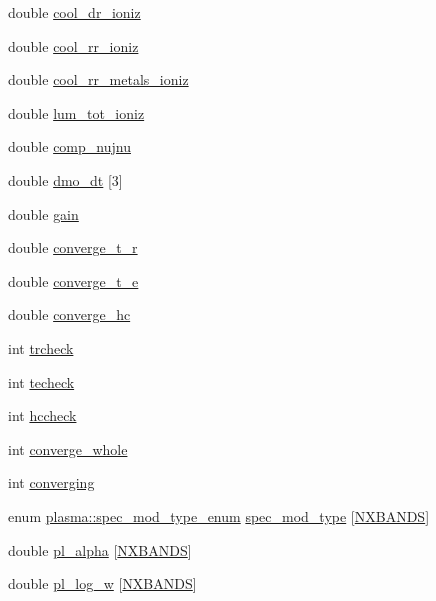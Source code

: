 \begin{DoxyCompactItemize}
\item 
double \hyperlink{structplasma_a5a044a5991244d771cf0937a322bff4f}{cool\+\_\+dr\+\_\+ioniz}
\item 
double \hyperlink{structplasma_a247ec26b8304ce5ef0f0489a9a4b6332}{cool\+\_\+rr\+\_\+ioniz}
\item 
double \hyperlink{structplasma_a1ded6465a492ddef36a6ef7a555359ec}{cool\+\_\+rr\+\_\+metals\+\_\+ioniz}
\item 
double \hyperlink{structplasma_af27d3aeeb9b6c87198ebe89c7990ff48}{lum\+\_\+tot\+\_\+ioniz}
\item 
double \hyperlink{structplasma_a57a290ba7730852666e194dcd1d594e6}{comp\+\_\+nujnu}
\item 
double \hyperlink{structplasma_a3447796c585931795cefa93400544b15}{dmo\+\_\+dt} \mbox{[}3\mbox{]}
\item 
double \hyperlink{structplasma_abd08d926f7b31dc9ddfaf5bc0c02de8f}{gain}
\item 
double \hyperlink{structplasma_a41bc8bd1fad69fdfe93c152eefdd4933}{converge\+\_\+t\+\_\+r}
\item 
double \hyperlink{structplasma_a7dc5aebabe90a8a5fa17ed2585de401c}{converge\+\_\+t\+\_\+e}
\item 
double \hyperlink{structplasma_ac74499cb432f536f838a1f4e4eccf5bc}{converge\+\_\+hc}
\item 
int \hyperlink{structplasma_a0a97b073aaa0261c8cd76c5ddb0e680a}{trcheck}
\item 
int \hyperlink{structplasma_ae1ff443abf16813160cb9756d33f81d9}{techeck}
\item 
int \hyperlink{structplasma_a4211e8aceb5ea7e09f9a359b99faa859}{hccheck}
\item 
int \hyperlink{structplasma_a59f5cb4220fd78cea7972db755f58291}{converge\+\_\+whole}
\item 
int \hyperlink{structplasma_a89b513b0ebeb3ecad39803fc04e2dc6c}{converging}
\item 
enum \hyperlink{structplasma_a51fdb6f34dda1cdb03a9aebfee249706}{plasma\+::spec\+\_\+mod\+\_\+type\+\_\+enum} \hyperlink{structplasma_a110b6efdc5fa932c21dc021047b35eea}{spec\+\_\+mod\+\_\+type} \mbox{[}\hyperlink{python_8h_ac640b7fc429348ef2f6781704d3c5163}{N\+X\+B\+A\+N\+DS}\mbox{]}
\item 
double \hyperlink{structplasma_a0dbad3f32ea372492eb73eda0f123899}{pl\+\_\+alpha} \mbox{[}\hyperlink{python_8h_ac640b7fc429348ef2f6781704d3c5163}{N\+X\+B\+A\+N\+DS}\mbox{]}
\item 
double \hyperlink{structplasma_aae85efc36fb767cfec53df4cd3327fe8}{pl\+\_\+log\+\_\+w} \mbox{[}\hyperlink{python_8h_ac640b7fc429348ef2f6781704d3c5163}{N\+X\+B\+A\+N\+DS}\mbox{]}

\end{DoxyCompactItemize}
